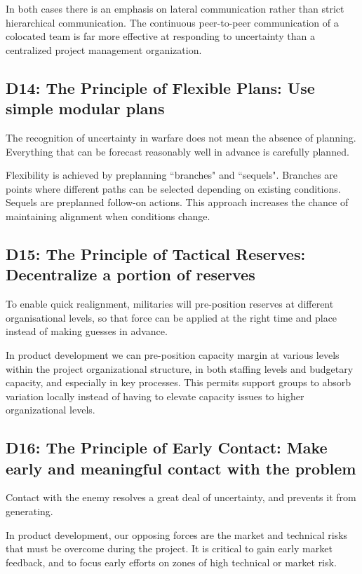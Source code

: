 \documentclass{article}
\begin{document}
\begin{multicols}{2}
In both cases there is an emphasis on lateral communication rather than strict hierarchical communication. The continuous peer-to-peer communication of a colocated team is far more effective at responding to uncertainty than a centralized project management organization.

\subsection{D14: The Principle of Flexible Plans: Use simple modular plans}

The recognition of uncertainty in warfare does not mean the absence of planning. Everything that can be forecast reasonably well in advance is carefully planned.

Flexibility is achieved by preplanning ``branches" and ``sequels". Branches are points where different paths can be selected depending on existing conditions. Sequels are preplanned follow-on actions. This approach increases the chance of maintaining alignment when conditions change.

\subsection{D15: The Principle of Tactical Reserves: Decentralize a portion of reserves}

To enable quick realignment, militaries will pre-position reserves at different organisational levels, so that force can be applied at the right time and place instead of making guesses in advance.

In product development we can pre-position capacity margin at various levels within the project organizational structure, in both staffing levels and budgetary capacity, and especially in key processes. This permits support groups to absorb variation locally instead of having to elevate capacity issues to higher organizational levels.

\subsection{D16: The Principle of Early Contact: Make early and meaningful contact with the problem}

Contact with the enemy resolves a great deal of uncertainty, and prevents it from generating.

In product development, our opposing forces are the market and technical risks that must be overcome during the project. It is critical to gain early market feedback, and to focus early efforts on zones of high technical or market risk.

\end{multicols}
\end{document}
